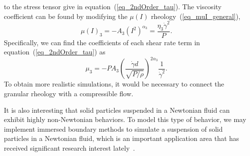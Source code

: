   to the stress tensor give in equation~(\ref{eq_2ndOrder_tau}).
 The viscosity coefficient can be found by modifying the $\mu(I)$ rheology~(\ref{eq_muI_general}),
\begin{equation}
    \mu(I)_3 = -A_3 \left( I^2 \right)^{\alpha_3} = \frac{\eta_3 \dot{\gamma}^2}{P}.
\label{eq_muI3}
\end{equation}
Specifically, we can find the coefficients of each shear rate term in equation~(\ref{eq_2ndOrder_tau}) as
\begin{equation}
     \mu_3  = 
    - P A_3 
        \left( \frac{\dot{\gamma} d }{\sqrt{P /\rho}}  \right)^{2\alpha_3} 
        \frac{1}{\dot{\gamma}^2}.
\label{eq_gr_eta_3}
\end{equation}
To obtain more realistic simulations, it would be necessary to connect the granular rheology with a compressible flow.
\par
It is also interesting that solid particles suspended in a Newtonian fluid can exhibit highly non-Newtonian behaviors. To model this type of behavior, we may implement immersed boundary methods to simulate a suspension of solid particles in a Newtonian fluid, which is an important application area that has received significant research interest lately~\cite{couturier_suspensions_2011}.

